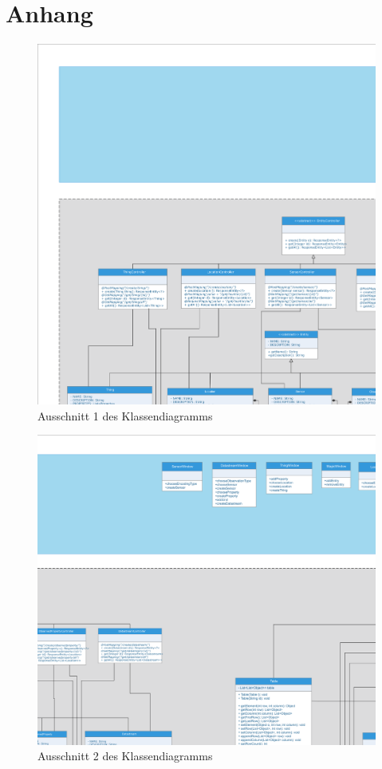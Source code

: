\section{Anhang}\label{anh}

\begin{figure}[!h]
\centering
\includegraphics[scale=0.4]{uml/screenshots/frithjof/slice_0_0}
\caption{Ausschnitt 1 des Klassendiagramms}
\end{figure}
\clearpage

\begin{figure}[!h]
\centering
\includegraphics[scale=0.4]{uml/screenshots/frithjof/slice_0_1}
\caption{Ausschnitt 2 des Klassendiagramms}
\end{figure}
\clearpage


